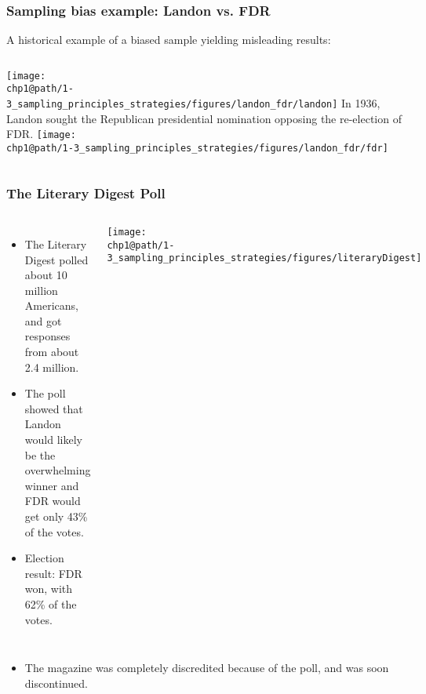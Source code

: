 \documentclass[slidestop,compress,mathserif]{beamer}
\makeatletter
\def\chp1@path{../../Chp 1}
\makeatother
\begin{document}

\begin{frame}
	\frametitle{Sampling bias example: Landon vs. FDR}

	A historical example of a biased sample yielding misleading results: \\

	$\:$ \\

	\begin{columns}[c]
		\texttt{[image: \\chp1@path/1-3\_sampling\_principles\_strategies/figures/landon\_fdr/landon]}
		In 1936, Landon sought the Republican presidential nomination opposing the re-election of FDR.
		\texttt{[image: \\chp1@path/1-3\_sampling\_principles\_strategies/figures/landon\_fdr/fdr]}
	\end{columns}

\end{frame}


\begin{frame}
	\frametitle{The Literary Digest Poll}

	\begin{columns}

		\begin{itemize}
			\item The Literary Digest polled about 10 million Americans, and got responses from about 2.4 million.
			\item The poll showed that Landon would likely be the overwhelming winner and FDR would get only 43\% of the votes.
			\item Election result:  FDR won, with 62\% of the votes.
		\end{itemize}


		\texttt{[image: \\chp1@path/1-3\_sampling\_principles\_strategies/figures/literaryDigest]}
	\end{columns}

	\begin{itemize}
		\item The magazine was completely discredited because of the poll, and was soon discontinued.
	\end{itemize}

\end{frame}
\end{document}
